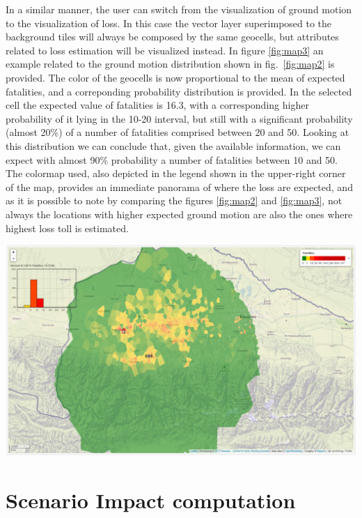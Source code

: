 \documentclass[12p]{article}
\begin{document}
In a similar manner, the user can switch from the visualization of ground motion
to the visualization of loss. In this case the vector layer superimposed to the
background tiles will always be composed by the same geocells, but attributes
related to loss estimation will be visualized instead. 
In figure \ref{fig:map3} an example related to the ground motion distribution
shown in fig.~\ref{fig:map2} is provided. The color of the geocells is now
proportional to the mean of expected fatalities, and a correponding probability
distribution is provided. In the selected cell the expected value of fatalities
is 16.3, with a corresponding higher probability of it lying in the 10-20
interval, but still with a significant probability (almost 20\%) of a number of
fatalities comprised between 20 and 50. Looking at this distribution we can
conclude that, given the available information, we can expect with almost 90\%
probability a number of fatalities between 10 and 50.
The colormap used, also depicted in the legend shown in the upper-right corner
of the map, provides an immediate panorama of where the loss are expected, and
as it is possible to note by comparing the figures \ref{fig:map2} and
\ref{fig:map3}, not always the locations with higher expected ground motion are
also the ones where highest loss toll is estimated.

\begin{center}
	\includegraphics[width=\textwidth]{map3}
\end{center}

\newpage
\section{Scenario Impact computation}
\label{sec:impact comp}
\end{document}

